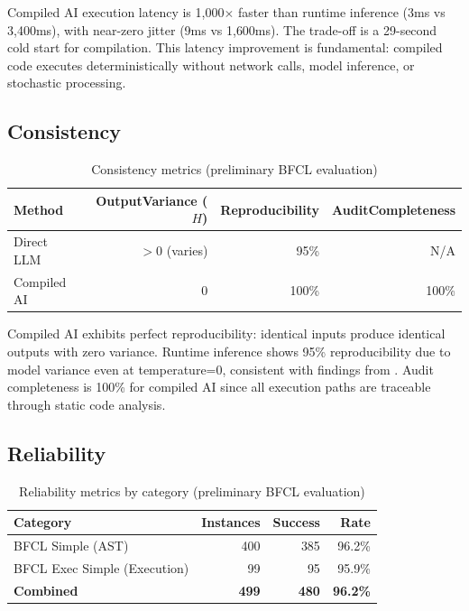 \documentclass[11pt]{article}
\begin{document}
Compiled AI execution latency is 1,000$\times$ faster than runtime inference (3ms vs 3,400ms), with near-zero jitter (9ms vs 1,600ms). The trade-off is a 29-second cold start for compilation. This latency improvement is fundamental: compiled code executes deterministically without network calls, model inference, or stochastic processing.

\subsection{Consistency}

\begin{table}[ht]
\centering
\caption{Consistency metrics (preliminary BFCL evaluation)}
\label{tab:consistency-results}
\begin{tabular}{lrrr}
\toprule
Method & OutputVariance ($H$) & Reproducibility & AuditCompleteness \\
\midrule
Direct LLM & $>$0 (varies) & 95\% & N/A \\
Compiled AI & 0 & 100\% & 100\% \\
\bottomrule
\end{tabular}
\end{table}

Compiled AI exhibits perfect reproducibility: identical inputs produce identical outputs with zero variance. Runtime inference shows 95\% reproducibility due to model variance even at temperature=0, consistent with findings from \citet{atil2024nondeterminism}. Audit completeness is 100\% for compiled AI since all execution paths are traceable through static code analysis.

\subsection{Reliability}

\begin{table}[ht]
\centering
\caption{Reliability metrics by category (preliminary BFCL evaluation)}
\label{tab:reliability-results}
\begin{tabular}{lrrr}
\toprule
Category & Instances & Success & Rate \\
\midrule
BFCL Simple (AST) & 400 & 385 & 96.2\% \\
BFCL Exec Simple (Execution) & 99 & 95 & 95.9\% \\
\midrule
\textbf{Combined} & \textbf{499} & \textbf{480} & \textbf{96.2\%} \\
\bottomrule
\end{tabular}
\end{table}
\end{document}
